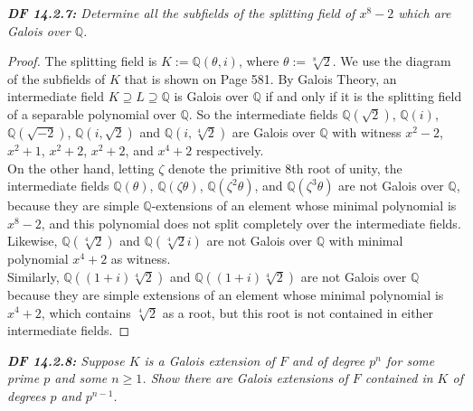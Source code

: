 \documentclass{article}
\begin{document}
\it \textbf{DF 14.2.7:} Determine all the subfields of the splitting field
  of $x^8-2$ which are Galois over $\mathbb{Q}$.

  \begin{proof}
    The splitting field is $K:=\mathbb{Q}(\theta,i)$, where
    $\theta:=\sqrt[8]{2}$. We use the diagram of the subfields of $K$ that
    is shown on Page 581. By Galois Theory, an intermediate field
    $K\supseteq L\supseteq\mathbb{Q}$ is Galois over $\mathbb{Q}$ if and
    only if it is the splitting field of a separable polynomial over
    $\mathbb{Q}$. So the intermediate fields $\mathbb{Q}(\sqrt{2})$,
    $\mathbb{Q}(i)$, $\mathbb{Q}(\sqrt{-2})$, $\mathbb{Q}(i,\sqrt{2})$ and
    $\mathbb{Q}(i,\sqrt[4]{2})$ are Galois over
    $\mathbb{Q}$ with witness $x^2-2$, $x^2+1$, $x^2+2$, $x^2+2$, and
    $x^4+2$ respectively. \\

    On the other hand, letting $\zeta$ denote the primitive 8th root of
    unity, the intermediate fields $\mathbb{Q}(\theta)$,
    $\mathbb{Q}(\zeta\theta)$, $\mathbb{Q}(\zeta^2\theta)$, and
    $\mathbb{Q}(\zeta^3\theta)$ are not Galois over $\mathbb{Q}$, because
    they are simple $\mathbb{Q}$-extensions of an element whose minimal
    polynomial is $x^8-2$, and this polynomial does not split completely
    over the intermediate fields. Likewise, $\mathbb{Q}(\sqrt[4]{2})$ and
    $\mathbb{Q}(\sqrt[4]{2}i)$ are not Galois over $\mathbb{Q}$ with
    minimal polynomial $x^4+2$ as witness. \\

    Similarly, $\mathbb{Q}((1+i)\sqrt[4]{2})$ and
    $\mathbb{Q}((1+i)\sqrt[4]{2})$ are not Galois over $\mathbb{Q}$ because
    they are simple extensions of an element whose minimal polynomial is
    $x^4+2$, which contains $\sqrt[4]{2}$ as a root, but this root is not
    contained in either intermediate fields.
  \end{proof}

\it \textbf{DF 14.2.8:} Suppose $K$ is a Galois extension of $F$ and of
  degree $p^n$ for some prime $p$ and some $n\geq1$. Show there are Galois
  extensions of $F$ contained in $K$ of degrees $p$ and $p^{n-1}$.
\end{document}
